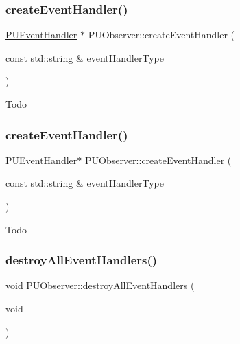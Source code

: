 \subsubsection{\texorpdfstring{create\+Event\+Handler()}{createEventHandler()}\hspace{0.1cm}{\footnotesize\ttfamily [1/2]}}
{\footnotesize\ttfamily \hyperlink{classPUEventHandler}{P\+U\+Event\+Handler} $\ast$ P\+U\+Observer\+::create\+Event\+Handler (\begin{DoxyParamCaption}\item[{const std\+::string \&}]{event\+Handler\+Type }\end{DoxyParamCaption})}

Todo \mbox{\label{classPUObserver_ae2a4fc75b6fb674ae8a83e61d55f3bfc}} 
\subsubsection{\texorpdfstring{create\+Event\+Handler()}{createEventHandler()}\hspace{0.1cm}{\footnotesize\ttfamily [2/2]}}
{\footnotesize\ttfamily \hyperlink{classPUEventHandler}{P\+U\+Event\+Handler}$\ast$ P\+U\+Observer\+::create\+Event\+Handler (\begin{DoxyParamCaption}\item[{const std\+::string \&}]{event\+Handler\+Type }\end{DoxyParamCaption})}

Todo \mbox{\label{classPUObserver_a8fd1d6c0034cc9ff650718e3a3c667f3}} 
\subsubsection{\texorpdfstring{destroy\+All\+Event\+Handlers()}{destroyAllEventHandlers()}\hspace{0.1cm}{\footnotesize\ttfamily [1/2]}}
{\footnotesize\ttfamily void P\+U\+Observer\+::destroy\+All\+Event\+Handlers (\begin{DoxyParamCaption}\item[{void}]{ }\end{DoxyParamCaption})}

